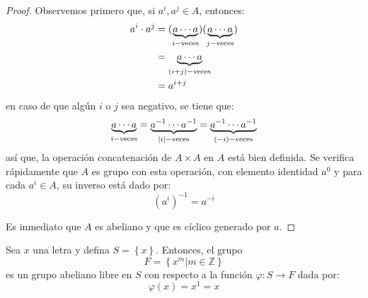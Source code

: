 \documentclass[12pt]{report}
\newcounter{it}
\theoremstyle{largebreak}
\newcommand\abs[1]{\ensuremath{\left|#1\right|}}
\newcommand\cf[3]{\ensuremath{#1:#2\rightarrow#3}}
\begin{document}
    \begin{proof}
        Observemos primero que, si $a^i,a^j\in A$, entonces:
        \begin{equation*}
            \begin{split}
                a^i\cdot a^j&=(\underset{i-\textup{veces}}{\underbrace{a\cdots a}})(\underset{j-\textup{veces}}{\underbrace{a\cdots a}})\\
                &=\underset{(i+j)-\textup{veces}}{\underbrace{a\cdots a}}\\
                &=a^{ i+j}\\
            \end{split}
        \end{equation*}
        en caso de que algún $i$ o $j$ sea negativo, se tiene que:
        \begin{equation*}
            \underset{i-\textup{veces}}{\underbrace{a\cdots a}}=\underset{\abs{i}-\textup{veces}}{\underbrace{a^{-1}\cdots a^{-1}}}
            =\underset{(-i)-\textup{veces}}{\underbrace{a^{-1}\cdots a^{-1}}}
        \end{equation*}
        así que, la operación concatenación de $A\times A$ en $A$ está bien definida. Se verifica rápidamente que $A$ es grupo con esta operación, con elemento identidad $a^0$ y para cada $a^i\in A$, su inverso está dado por:
        \begin{equation*}
            (a^i)^{-1}=a^{-i}
        \end{equation*}

        Es inmediato que $A$ es abeliano y que es cíclico generado por $a$.
    \end{proof}

    \begin{propo}
        \label{freeAbelianOneGroup}
        Sea $x$ una letra y defina $S=\left\{x \right\}$. Entonces, el grupo
        \begin{equation*}
            F=\left\{x^m\Big|m\in\mathbb{Z} \right\}
        \end{equation*}
        es un grupo abeliano libre en $S$ con respecto a la función $\cf{\varphi}{S}{F}$ dada por:
        \begin{equation*}
            \varphi(x)=x^1=x
        \end{equation*}
    \end{propo}
\end{document}
